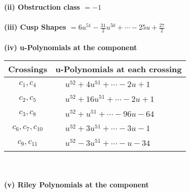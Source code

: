 \documentclass[1p]{elsarticle_modified}
\theoremstyle{definition}
\begin{document}
\flushleft \textbf{(ii) Obstruction class $= -1$}\\~\\
\flushleft \textbf{(iii) Cusp Shapes $= 6 u^{51}-\frac{31}{2} u^{50}+\cdots-25 u+\frac{27}{2}$}\\~\\
\newpage\renewcommand{\arraystretch}{1}
\flushleft \textbf{(iv) u-Polynomials at the component}\newline \\
\begin{tabular}{m{50pt}|m{274pt}}
Crossings & \hspace{64pt}u-Polynomials at each crossing \\
\hline $$\begin{aligned}c_{1},c_{4}\end{aligned}$$&$\begin{aligned}
&u^{52}+4 u^{51}+\cdots-2 u+1
\end{aligned}$\\
\hline $$\begin{aligned}c_{2},c_{5}\end{aligned}$$&$\begin{aligned}
&u^{52}+16 u^{51}+\cdots-2 u+1
\end{aligned}$\\
\hline $$\begin{aligned}c_{3},c_{8}\end{aligned}$$&$\begin{aligned}
&u^{52}+u^{51}+\cdots-96 u-64
\end{aligned}$\\
\hline $$\begin{aligned}c_{6},c_{7},c_{10}\end{aligned}$$&$\begin{aligned}
&u^{52}+3 u^{51}+\cdots-3 u-1
\end{aligned}$\\
\hline $$\begin{aligned}c_{9},c_{11}\end{aligned}$$&$\begin{aligned}
&u^{52}-3 u^{51}+\cdots- u-34
\end{aligned}$\\
\hline
\end{tabular}\\~\\
\newpage\renewcommand{\arraystretch}{1}
\flushleft \textbf{(v) Riley Polynomials at the component}\newline \\
\end{document}
